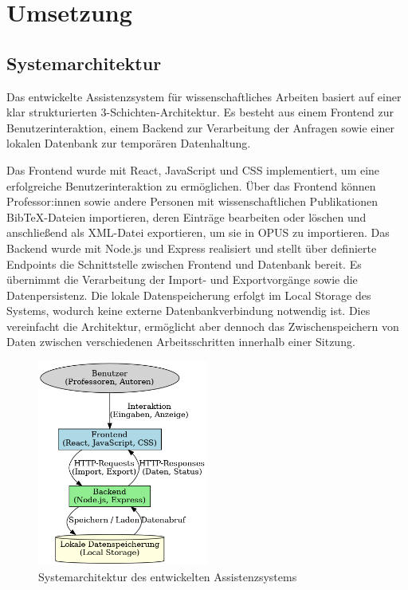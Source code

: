 \chapter{Umsetzung}

\section{Systemarchitektur}
Das entwickelte Assistenzsystem für wissenschaftliches Arbeiten basiert auf einer klar strukturierten 3-Schichten-Architektur. 
Es besteht aus einem Frontend zur Benutzerinteraktion, einem Backend zur Verarbeitung der Anfragen sowie einer lokalen Datenbank 
zur temporären Datenhaltung.

Das Frontend wurde mit React, JavaScript und CSS implementiert, um eine erfolgreiche Benutzerinteraktion zu ermöglichen. 
Über das Frontend können Professor:innen sowie andere Personen mit wissenschaftlichen Publikationen BibTeX-Dateien importieren, 
deren Einträge bearbeiten oder löschen und anschließend als XML-Datei exportieren, um sie in OPUS zu importieren. Das Backend 
wurde mit Node.js und Express realisiert und stellt über definierte Endpoints die Schnittstelle zwischen Frontend und Datenbank 
bereit. Es übernimmt die Verarbeitung der Import- und Exportvorgänge sowie die Datenpersistenz. Die lokale Datenspeicherung 
erfolgt im Local Storage des Systems, wodurch keine externe Datenbankverbindung notwendig ist. Dies vereinfacht die Architektur, 
ermöglicht aber dennoch das Zwischenspeichern von Daten zwischen verschiedenen Arbeitsschritten innerhalb einer Sitzung.

\begin{figure}[h]
    \centering
    \includegraphics[width=0.5\textwidth]{Graphics/systemarchitektur_diagramm.png}
    \caption{Systemarchitektur des entwickelten Assistenzsystems}
    \label{fig:systemarchitektur}
\end{figure}


